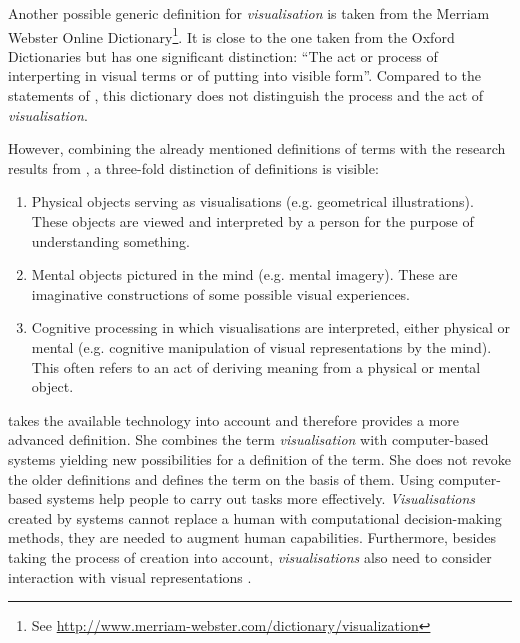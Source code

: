 Another possible generic definition for \textit{visualisation} is taken from the Merriam Webster Online Dictionary\footnote{See \href{http://www.merriam-webster.com/dictionary/visualization}{http://www.merriam-webster.com/dictionary/visualization}}. It is close to the one taken from the Oxford Dictionaries but has one significant distinction: ``The act or process of interperting in visual terms or of putting into visible form''. Compared to the statements of \citeauthor{Phillips2010}, this dictionary does not distinguish the process and the act of \textit{visualisation}.

However, combining the already mentioned definitions of terms with the research results from \citeauthor{Phillips2010}, a three-fold distinction of definitions is visible:
\begin{enumerate}
\item Physical objects serving as visualisations (e.g. geometrical illustrations). These objects are viewed and interpreted by a person for the purpose of understanding something.
\item Mental objects pictured in the mind (e.g. mental imagery). These are imaginative constructions of some possible visual experiences.
\item Cognitive processing in which visualisations are interpreted, either physical or mental (e.g. cognitive manipulation of visual representations by the mind). This often refers to an act of deriving meaning from a physical or mental object.
\end{enumerate}

\cbstart
\citeauthor{Munzner2014} takes the available technology into account and therefore provides a more advanced definition. She combines the term \textit{visualisation} with computer-based systems yielding new possibilities for a definition of the term. She does not revoke the older definitions and defines the term on the basis of them.
Using computer-based systems help people to carry out tasks more effectively.
\textit{Visualisations} created by systems cannot replace a human with computational decision-making methods, they are needed to augment human capabilities. Furthermore, besides taking the process of creation into account, \textit{visualisations} also need to consider interaction with visual representations .


